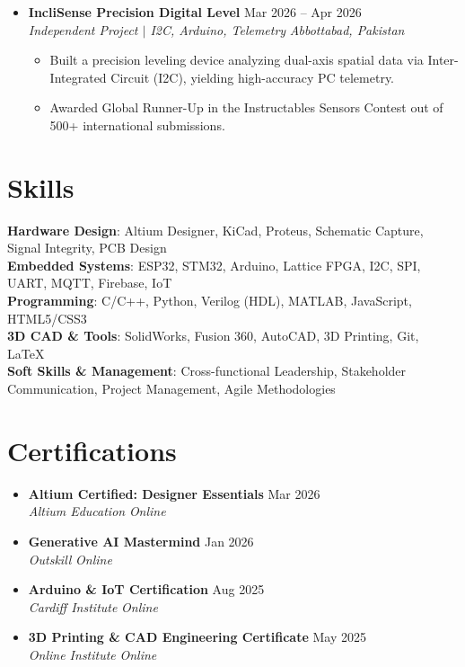 \documentclass[letterpaper,10pt]{article}
\newcommand{\resumeItem}[1]{\item\small{#1}}
\newcommand{\resumeSubheading}[4]{
  \item
    \textbf{#1} \hfill #2 \\
    \textit{\small#3} \hfill \textit{\small #4}
}
\newcommand{\resumeCert}[3]{
  \item
    \textbf{#1} \hfill #3 \\
    \textit{\small#2} \hfill \textit{\small Online}
}
\begin{document}
\begin{itemize}[leftmargin=0in, label={}]
    \resumeSubheading
      {IncliSense Precision Digital Level}{Mar 2026 -- Apr 2026}
      {Independent Project $|$ I2C, Arduino, Telemetry}{Abbottabad, Pakistan}
      \vspace{-4pt}
      \begin{itemize}[leftmargin=0.2in, label=\textbullet, itemsep=1pt]
        \resumeItem{Built a precision leveling device analyzing dual-axis spatial data via Inter-Integrated Circuit (I2C), yielding high-accuracy PC telemetry.}
        \resumeItem{Awarded Global Runner-Up in the Instructables Sensors Contest out of 500+ international submissions.}
      \end{itemize}

  \end{itemize}

\section{Skills}
  \begin{itemize}[leftmargin=0in, label={}]
    \small{\item{
      \textbf{Hardware Design}{: Altium Designer, KiCad, Proteus, Schematic Capture, Signal Integrity, PCB Design} \\
      \textbf{Embedded Systems}{: ESP32, STM32, Arduino, Lattice FPGA, I2C, SPI, UART, MQTT, Firebase, IoT} \\
      \textbf{Programming}{: C/C++, Python, Verilog (HDL), MATLAB, JavaScript, HTML5/CSS3} \\
      \textbf{3D CAD \& Tools}{: SolidWorks, Fusion 360, AutoCAD, 3D Printing, Git, LaTeX} \\
      \textbf{Soft Skills \& Management}{: Cross-functional Leadership, Stakeholder Communication, Project Management, Agile Methodologies}
    }}
  \end{itemize}

\section{Certifications}
  \begin{itemize}[leftmargin=0in, label={}, itemsep=1pt]
    \resumeCert{Altium Certified: Designer Essentials}{Altium Education}{Mar 2026}
    \resumeCert{Generative AI Mastermind}{Outskill}{Jan 2026}
    \resumeCert{Arduino \& IoT Certification}{Cardiff Institute}{Aug 2025}
    \resumeCert{3D Printing \& CAD Engineering Certificate}{Online Institute}{May 2025}
  \end{itemize}
\end{document}
